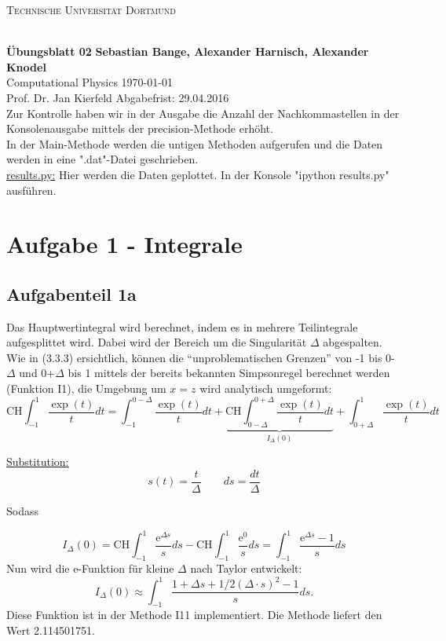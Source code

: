 

\noindent
\centerline{\small{\textsc{Technische Universität Dortmund}}} \\
\large\textbf{Übungsblatt 02} \hfill \footnotesize\textbf{Sebastian Bange, Alexander Harnisch, Alexander Knodel} \\
\normalsize Computational Physics \hfill \today \\
Prof. Dr. Jan Kierfeld \hfill Abgabefrist: 29.04.2016\\
\noindent\makebox[\linewidth]{\rule{\textwidth}{0.4pt}}
Zur Kontrolle haben wir in der Ausgabe die Anzahl der Nachkommastellen in der Konsolenausgabe mittels der precision-Methode erhöht.\\
In der Main-Methode werden die untigen Methoden aufgerufen und die Daten werden in eine ".dat"-Datei geschrieben. \\
\underline{results.py:}
Hier werden die Daten geplottet. In der Konsole "ipython results.py" ausführen.
\section*{Aufgabe 1 - Integrale}
\subsection*{Aufgabenteil 1a}
Das Hauptwertintegral wird berechnet, indem es in mehrere Teilintegrale aufgesplittet wird. Dabei
wird der Bereich um die Singularität $\Delta$ abgespalten. Wie in (3.3.3)\cite[39]{script} ersichtlich, können
die \enquote{unproblematischen Grenzen} von -1 bis 0-$\Delta$ und 0+$\Delta$ bis 1 mittels der
bereits bekannten Simpsonregel berechnet werden (Funktion I1), die Umgebung um $x = z$ wird
analytisch umgeformt: \begin{equation*}
\text{CH} \int_{-1}^{1} \frac{\exp(t)}{t} dt = \int_{-1}^{0-\Delta}\frac{\exp(t)}{t}dt+\underbrace{\text{CH}\int_{0-\Delta}^{0+\Delta}\frac{\exp(t)}{t}dt}_{I_{\Delta}(0)}+\int_{0+\Delta}^1\frac{\exp(t)}{t}dt
\end{equation*}

\underline{Substitution:}
\begin{equation*}
s(t) = \frac{t}{\Delta} \qquad ds = \frac{dt}{\Delta}
\end{equation*}

Sodass

\begin{equation*}
I_{\Delta}(0) = \text{CH} \int_{-1}^{1} \frac{\mathup{e}^{\Delta s}}{s} ds - \text{CH} \int_{-1}^1 \frac{\mathup{e}^0}{s} ds = \int_{-1}^{1} \frac{\mathup{e}^{\Delta s}-1}{s} ds
\end{equation*}
Nun wird die e-Funktion für kleine $\Delta$ nach Taylor entwickelt:
\begin{equation*}
I_{\Delta}(0) \approx \int_{-1}^{1} \frac{1+\Delta s + 1/2 \left(\Delta \cdot s\right)^2 -1}{s} ds.
\end{equation*}
Diese Funktion ist in der Methode I11 implementiert. Die Methode liefert den Wert 2.114501751.

